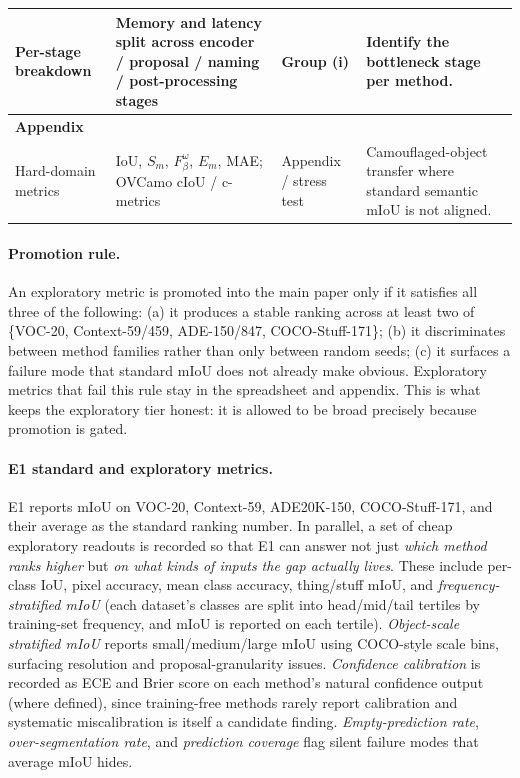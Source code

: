 \documentclass[11pt,a4paper]{article}
\begin{document}
{\begin{longtable}{p{} p{} p{} p{}}
Per-stage breakdown & Memory and latency split across encoder / proposal / naming / post-processing stages & Group (i) & Identify the bottleneck stage per method. \\
\midrule
\multicolumn{4}{l}{\textbf{Appendix}} \\
Hard-domain metrics & IoU, $S_m$, $F^\omega_\beta$, $E_m$, MAE; OVCamo cIoU / c-metrics & Appendix / stress test & Camouflaged-object transfer where standard semantic mIoU is not aligned. \\
\end{longtable}
}

\paragraph{Promotion rule.}
An exploratory metric is promoted into the main paper only if it satisfies all three of the following: (a) it produces a stable ranking across at least two of \{VOC-20, Context-59/459, ADE-150/847, COCO-Stuff-171\}; (b) it discriminates between method families rather than only between random seeds; (c) it surfaces a failure mode that standard mIoU does not already make obvious. Exploratory metrics that fail this rule stay in the spreadsheet and appendix. This is what keeps the exploratory tier honest: it is allowed to be broad precisely because promotion is gated.

\paragraph{E1 standard and exploratory metrics.}
E1 reports mIoU on VOC-20, Context-59, ADE20K-150, COCO-Stuff-171, and their average as the standard ranking number. In parallel, a set of cheap exploratory readouts is recorded so that E1 can answer not just \emph{which method ranks higher} but \emph{on what kinds of inputs the gap actually lives}. These include per-class IoU, pixel accuracy, mean class accuracy, thing/stuff mIoU, and \emph{frequency-stratified mIoU} (each dataset's classes are split into head/mid/tail tertiles by training-set frequency, and mIoU is reported on each tertile). \emph{Object-scale stratified mIoU} reports small/medium/large mIoU using COCO-style scale bins, surfacing resolution and proposal-granularity issues. \emph{Confidence calibration} is recorded as ECE and Brier score on each method's natural confidence output (where defined), since training-free methods rarely report calibration and systematic miscalibration is itself a candidate finding. \emph{Empty-prediction rate}, \emph{over-segmentation rate}, and \emph{prediction coverage} flag silent failure modes that average mIoU hides.
\end{document}
